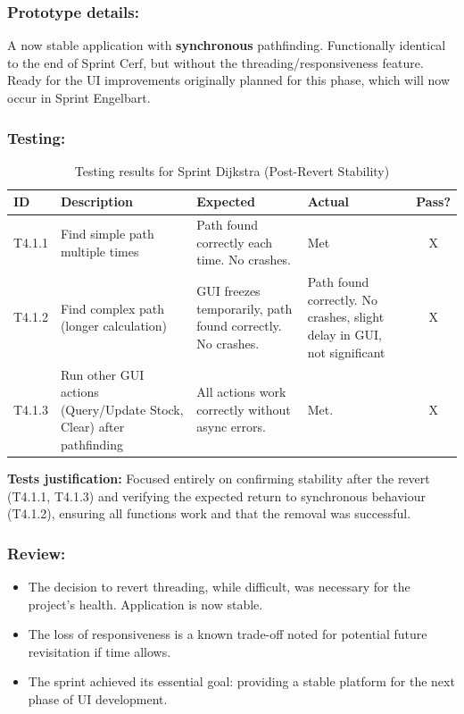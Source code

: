 

\newpage

\subsubsection{Prototype details:}
A now stable application with \textbf{synchronous} pathfinding. Functionally identical to the end of Sprint Cerf, but without the threading/responsiveness feature. Ready for the UI improvements originally planned for this phase, which will now occur in Sprint Engelbart.

\subsubsection{Testing:}
\begin{table}[htbp]
	\centering
	\begin{tabularx}{\textwidth}{|l|X|p{3.5cm}|p{3.5cm}|c|}
		\hline
		\textbf{ID} & \textbf{Description} & \textbf{Expected} & \textbf{Actual} & \textbf{Pass?} \\
		\hline
		T4.1.1 & Find simple path multiple times & Path found correctly each time. No crashes. & Met & X \\
		\hline
		T4.1.2 & Find complex path (longer calculation) & GUI freezes temporarily, path found correctly. No crashes. & Path found correctly. No crashes, slight delay in GUI, not significant & X \\
		\hline
		T4.1.3 & Run other GUI actions (Query/Update Stock, Clear) after pathfinding & All actions work correctly without async errors. & Met. & X \\
		\hline
	\end{tabularx}
	\caption{Testing results for Sprint Dijkstra (Post-Revert Stability)}
\end{table}
\textbf{Tests justification:} Focused entirely on confirming stability after the revert (T4.1.1, T4.1.3) and verifying the expected return to synchronous behaviour (T4.1.2), ensuring all functions work and that the removal was successful.

\subsubsection{Review:}
\begin{itemize}
	\item The decision to revert threading, while difficult, was necessary for the project's health. Application is now stable.
	\item The loss of responsiveness is a known trade-off noted for potential future revisitation if time allows.
	\item The sprint achieved its essential goal: providing a stable platform for the next phase of UI development.
\end{itemize}

